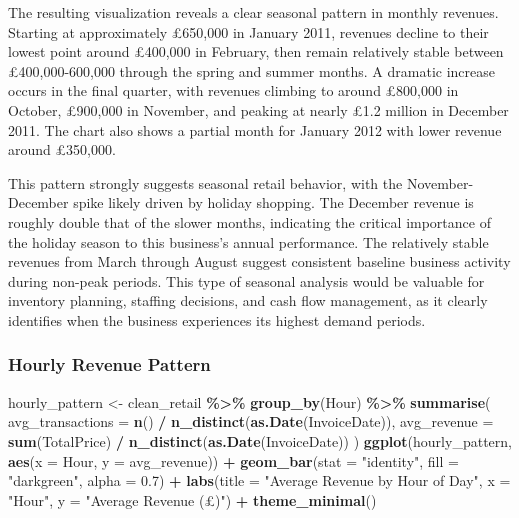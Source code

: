 \documentclass[
]{article}
\newenvironment{Shaded}{\begin{snugshade}}{\end{snugshade}}
\newcommand{\AttributeTok}[1]{\textcolor[rgb]{0.13,0.29,0.53}{#1}}
\newcommand{\FloatTok}[1]{\textcolor[rgb]{0.00,0.00,0.81}{#1}}
\newcommand{\FunctionTok}[1]{\textcolor[rgb]{0.13,0.29,0.53}{\textbf{#1}}}
\newcommand{\NormalTok}[1]{#1}
\newcommand{\OtherTok}[1]{\textcolor[rgb]{0.56,0.35,0.01}{#1}}
\newcommand{\SpecialCharTok}[1]{\textcolor[rgb]{0.81,0.36,0.00}{\textbf{#1}}}
\newcommand{\StringTok}[1]{\textcolor[rgb]{0.31,0.60,0.02}{#1}}
\begin{document}
The resulting visualization reveals a clear seasonal pattern in monthly
revenues. Starting at approximately £650,000 in January 2011, revenues
decline to their lowest point around £400,000 in February, then remain
relatively stable between £400,000-600,000 through the spring and summer
months. A dramatic increase occurs in the final quarter, with revenues
climbing to around £800,000 in October, £900,000 in November, and
peaking at nearly £1.2 million in December 2011. The chart also shows a
partial month for January 2012 with lower revenue around £350,000.

This pattern strongly suggests seasonal retail behavior, with the
November-December spike likely driven by holiday shopping. The December
revenue is roughly double that of the slower months, indicating the
critical importance of the holiday season to this business's annual
performance. The relatively stable revenues from March through August
suggest consistent baseline business activity during non-peak periods.
This type of seasonal analysis would be valuable for inventory planning,
staffing decisions, and cash flow management, as it clearly identifies
when the business experiences its highest demand periods.\newpage

\subsubsection{Hourly Revenue Pattern}\label{hourly-revenue-pattern}

\begin{Shaded}
\begin{Highlighting}[]
\NormalTok{hourly\_pattern }\OtherTok{\textless{}{-}}\NormalTok{ clean\_retail }\SpecialCharTok{\%\textgreater{}\%}
  \FunctionTok{group\_by}\NormalTok{(Hour) }\SpecialCharTok{\%\textgreater{}\%}
  \FunctionTok{summarise}\NormalTok{(}
    \AttributeTok{avg\_transactions =} \FunctionTok{n}\NormalTok{() }\SpecialCharTok{/} \FunctionTok{n\_distinct}\NormalTok{(}\FunctionTok{as.Date}\NormalTok{(InvoiceDate)),}
    \AttributeTok{avg\_revenue =} \FunctionTok{sum}\NormalTok{(TotalPrice) }\SpecialCharTok{/} \FunctionTok{n\_distinct}\NormalTok{(}\FunctionTok{as.Date}\NormalTok{(InvoiceDate))}
\NormalTok{  )}
\FunctionTok{ggplot}\NormalTok{(hourly\_pattern, }\FunctionTok{aes}\NormalTok{(}\AttributeTok{x =}\NormalTok{ Hour, }\AttributeTok{y =}\NormalTok{ avg\_revenue)) }\SpecialCharTok{+}
  \FunctionTok{geom\_bar}\NormalTok{(}\AttributeTok{stat =} \StringTok{"identity"}\NormalTok{, }\AttributeTok{fill =} \StringTok{"darkgreen"}\NormalTok{, }\AttributeTok{alpha =} \FloatTok{0.7}\NormalTok{) }\SpecialCharTok{+}
  \FunctionTok{labs}\NormalTok{(}\AttributeTok{title =} \StringTok{"Average Revenue by Hour of Day"}\NormalTok{, }\AttributeTok{x =} \StringTok{"Hour"}\NormalTok{, }\AttributeTok{y =} \StringTok{"Average Revenue (£)"}\NormalTok{) }\SpecialCharTok{+}
  \FunctionTok{theme\_minimal}\NormalTok{()}
\end{Highlighting}
\end{Shaded}
\end{document}
